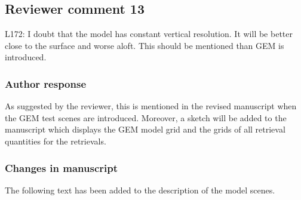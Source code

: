 
%


\subsection*{Reviewer comment 13}
L172: I doubt that the model has constant vertical resolution.  It will be better close to the surface and worse aloft. This should be mentioned than GEM is introduced.

\subsubsection*{Author response}

As suggested by the reviewer, this is mentioned in the revised manuscript when
the GEM test scenes are introduced. Moreover, a sketch will be added to the
manuscript which displays the GEM model grid and the grids of all retrieval
quantities for the retrievals.

\subsubsection*{Changes in manuscript}

The following text has been added to the description of the model scenes.

\begin{change}[92]
\DIFaddend
\end{change}

